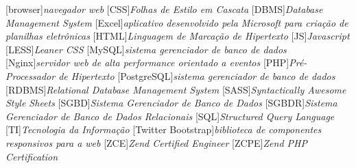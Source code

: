 
[browser]{\textit{navegador web}}
[CSS]{\textit{Folhas de Estilo em Cascata}}
[DBMS]{\textit{Database Management System}}
[Excel]{\textit{aplicativo desenvolvido pela Microsoft para
criação de planilhas eletrônicas}}
[HTML]{\textit{Linguagem de Marcação de Hipertexto}}
[JS]{\textit{Javascript}}
[LESS]{\textit{Leaner CSS}}
[MySQL]{\textit{sistema gerenciador de banco de dados}}
[Nginx]{\textit{servidor web de alta performance orientado a
eventos}}
[PHP]{\textit{Pré-Processador de Hipertexto}}
[PostgreSQL]{\textit{sistema gerenciador de banco de dados}}
[RDBMS]{\textit{Relational Database Management System}}
[SASS]{\textit{Syntactically Awesome Style Sheets}}
[SGBD]{\textit{Sistema Gerenciador de Banco de Dados}}
[SGBDR]{\textit{Sistema Gerenciador de Banco de Dados Relacionais}}
[SQL]{\textit{Structured Query Language}}
[TI]{\textit{Tecnologia da Informação}}
[Twitter Bootstrap]{\textit{biblioteca de
componentes responsivos para a web}}
[ZCE]{\textit{Zend Certified Engineer}}
[ZCPE]{\textit{Zend PHP Certification}}